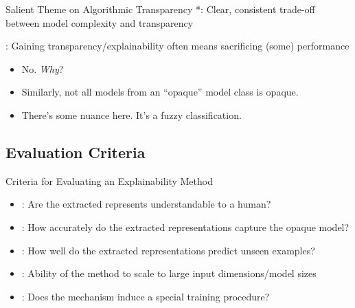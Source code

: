 \documentclass[11pt,dvipsnames,usenames,aspectratio=169]{beamer}  %
\begin{document}
\begin{frame}{Salient Theme on Algorithmic Transparency}
  *:  Clear, consistent trade-off between model complexity and transparency

  \vspace{16pt}
  \textbf{}: Gaining transparency/explainability often means sacrificing (some) performance

  \vspace{16pt}
  \begin{itemize}[<+->]
    \item No.  \textit{Why}?
    \item Similarly, not all models from an ``opaque'' model class is opaque.
    \item There's some nuance here.  It's a fuzzy classification.
  \end{itemize}

\end{frame}

\subsection{Evaluation Criteria}

\begin{frame}{Criteria for Evaluating an Explainability Method}
  \begin{itemize}[<+->]
    \setlength{\itemsep}{19pt}
    \item {}: Are the extracted represents understandable to a human?
    \item {}: How accurately do the extracted representations capture the opaque model?
    \item {}: How well do the extracted representations predict unseen examples?
    \item {}: Ability of the method to scale to large input dimensions/model sizes
    \item {}: Does the mechanism induce a special training procedure?
  \end{itemize}
\end{frame}
\end{document}
